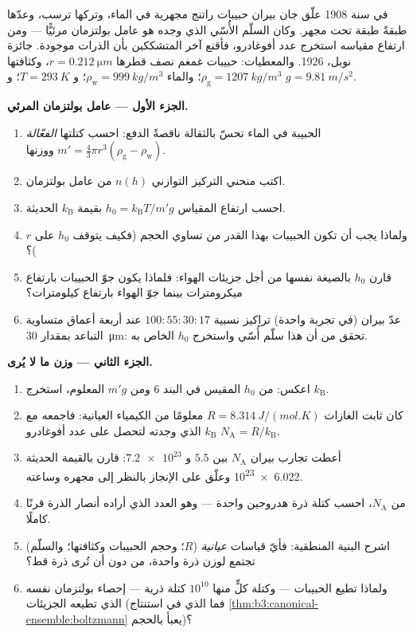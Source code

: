 \begin{problem}\label{pb:b3:canonical-ensemble:1}
في سنة 1908 علّق جان بيران حبيبات راتنج مجهرية في الماء،
وتركها ترسب، وعدّها طبقةً طبقة تحت
مجهر. وكان السلّم الأُسّي الذي وجده هو عامل بولتزمان
مرئيًّا --- ومن ارتفاع مقياسه استخرج
عدد أفوغادرو، فأقنع آخر المتشككين بأن الذرات موجودة.
جائزة نوبل، 1926. والمعطيات: حبيبات غمغم نصف قطرها $r =
\qty{0.212}{\micro m}$، وكثافتها $\rho_{\text{g}} =
\qty{1207}{kg/m^3}$؛ والماء $\rho_{\text{w}} = \qty{999}{kg/m^3}$؛
و $T = \qty{293}{K}$؛ و $g = \qty{9.81}{m/s^2}$.

\medskip\noindent\textbf{الجزء الأول --- عامل بولتزمان المرئي.}
\begin{enumerate}
  \item الحبيبة في الماء تحسّ بالثقالة ناقصةً الدفع: احسب كتلتها
        \emph{الفعّالة} $m' = \tfrac43\pi r^3(\rho_{\text{g}}
        - \rho_{\text{w}})$ ووزنها.
  \item اكتب منحني التركيز التوازني $n(h)$ من
        عامل بولتزمان.
  \item احسب ارتفاع المقياس $h_0 = k_{\text{B}}T/m'g$ بقيمة
        $k_{\text{B}}$ الحديثة.
  \item ولماذا يجب أن تكون الحبيبات بهذا القدر من تساوي الحجم (فكيف
        يتوقف $h_0$ على $r$)؟
  \item قارن $h_0$ بالصيغة نفسها من أجل جزيئات الهواء:
        فلماذا يكون جوّ الحبيبات بارتفاع ميكرومترات بينما
        جوّ الهواء بارتفاع كيلومترات؟
  \item عدّ بيران (في تجربة واحدة) تراكيز نسبية
        $100 : 55 : 30 : 17$ عند أربعة أعماق متساوية التباعد
        بمقدار \qty{30}{\micro m}: تحقق من أن هذا سلّم
        أُسّي واستخرج $h_0$ الخاص به.
\end{enumerate}

\medskip\noindent\textbf{الجزء الثاني --- وزن ما لا يُرى.}
\begin{enumerate}[resume]
  \item اعكس: من $h_0$ المقيس في البند 6 ومن $m'g$
        المعلوم، استخرج $k_{\text{B}}$.
  \item كان ثابت الغازات $R = \qty{8.314}{J/(mol.K)}$ معلومًا
        من الكيمياء العيانية: فاجمعه مع
        $k_{\text{B}}$ الذي وجدته لتحصل على عدد أفوغادرو $N_{\text{A}} =
        R/k_{\text{B}}$.
  \item أعطت تجارب بيران $N_{\text{A}}$ بين $5.5$ و
        $\num{7.2e23}$: قارن بالقيمة الحديثة
        \num{6.022e23} وعلّق على الإنجاز بالنظر إلى
        مجهره وساعته.
  \item من $N_{\text{A}}$، احسب كتلة ذرة هدروجين
        واحدة --- وهو العدد الذي أراده أنصار الذرة
        قرنًا كاملًا.
  \item اشرح البنية المنطقية: فأيّ قياسات \emph{عيانية}
        ($R$؛ وحجم الحبيبات وكثافتها؛ والسلّم)
        تجتمع لوزن ذرة واحدة، من دون أن تُرى ذرة قط؟
  \item ولماذا تطيع الحبيبات --- وكتلة كلٍّ منها $10^{10}$ كتلة ذرية ---
        إحصاء بولتزمان نفسه الذي تطيعه الجزيئات (فما الذي في
        استنتاج \cref{thm:b3:canonical-ensemble:boltzmann}
        يعبأ بالحجم)؟
\end{enumerate}


\end{problem}
